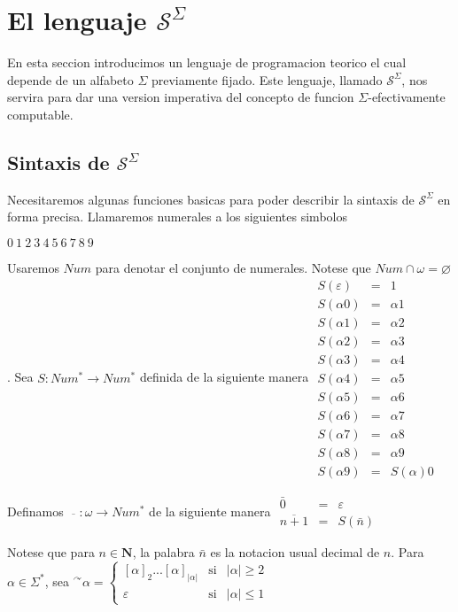 \section{El lenguaje \(\mathcal{S}^{\Sigma }\)}

En esta seccion introducimos un lenguaje de programacion teorico el cual depende de un alfabeto \(\Sigma \) previamente fijado. Este lenguaje, llamado \( \mathcal{S}^{\Sigma }\), nos servira para dar una version imperativa del concepto de funcion \(\Sigma \)-efectivamente computable.

\subsection{Sintaxis de \(\mathcal{S}^{\Sigma }\)}

Necesitaremos algunas funciones basicas para poder describir la sintaxis de \( \mathcal{S}^{\Sigma }\) en forma precisa. Llamaremos numerales a los siguientes simbolos

\(\displaystyle 0\ 1\ 2\ 3\ 4\ 5\ 6\ 7\ 8\ 9 \)

Usaremos \(Num\) para denotar el conjunto de numerales. Notese que \(Num\cap \omega =\varnothing \). Sea \(S:Num^{\ast }\rightarrow Num^{\ast }\) definida de la siguiente manera
\(\displaystyle \begin{array}{rcl} S(\varepsilon ) & =& 1 \\ S(\alpha 0) & =& \alpha 1 \\ S(\alpha 1) & =& \alpha 2 \\ S(\alpha 2) & =& \alpha 3 \\ S(\alpha 3) & =& \alpha 4 \\ S(\alpha 4) & =& \alpha 5 \\ S(\alpha 5) & =& \alpha 6 \\ S(\alpha 6) & =& \alpha 7 \\ S(\alpha 7) & =& \alpha 8 \\ S(\alpha 8) & =& \alpha 9 \\ S(\alpha 9) & =& S(\alpha )0 \end{array} \)

Definamos \(\overline{\ \ \ \;}:\omega \rightarrow Num^{\ast }\) de la siguiente manera
\(\displaystyle \begin{array}{rcl} \bar{0} & =& \varepsilon \\ \overline{n+1} & =& S(\bar{n}) \end{array} \)

Notese que para \(n\in \mathbf{N}\), la palabra \(\bar{n}\) es la notacion usual decimal de \(n\). Para \(\alpha \in \Sigma ^{\ast }\), sea
\(\displaystyle ^{\curvearrowright }\alpha =\left\{ \begin{array}{lll} \left[ \alpha \right] _{2}...\left[ \alpha \right] _{\left\vert \alpha \right\vert } & \text{si} & \left\vert \alpha \right\vert \geq 2 \\ \varepsilon & \text{si} & \left\vert \alpha \right\vert \leq 1 \end{array} \right. \)

